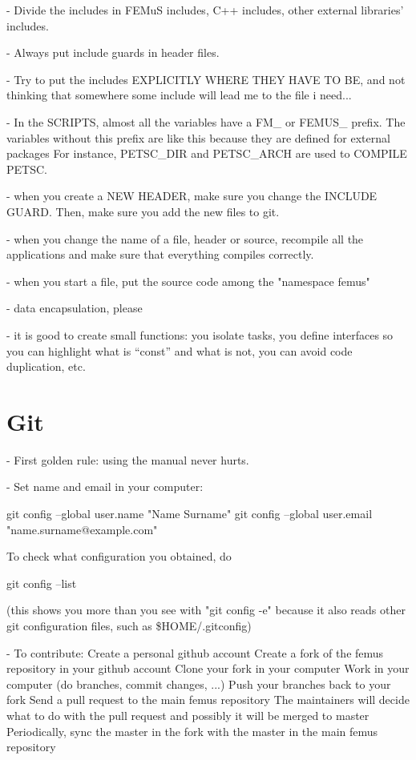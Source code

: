 \documentclass[10pt]{book}
\begin{document}
- Divide the includes in 
FEMuS includes,
 C++ includes,
 other external libraries' includes.

- Always put include guards in header files.

- Try to put the includes EXPLICITLY WHERE THEY HAVE TO BE, 
  and not thinking that somewhere some include will lead me to the file i need...

- In the SCRIPTS, almost all the variables have a FM\_ or FEMUS\_ prefix.
 The variables without this prefix are like this because 
 they are defined for external packages
 For instance, PETSC\_DIR and PETSC\_ARCH are used to COMPILE PETSC.
 
 - when you create a NEW HEADER, make sure you change the INCLUDE GUARD.
 Then, make sure you add the new files to git.
 
 - when you change the name of a file, header or source, recompile all the applications
   and make sure that everything compiles correctly.
   
 - when you start a file, put the source code among the "namespace femus"

 - data encapsulation, please
 
 - it is good to create small functions: you isolate tasks, 
   you define interfaces so you can highlight what is ``const'' and what is not,
   you can avoid code duplication, etc.
   
 
\chapter{Git}


- First golden rule: using the manual never hurts.

- Set name and email in your computer:

  git config --global user.name "Name Surname"
  git config --global user.email "name.surname@example.com"

  To check what configuration you obtained, do 

  git config --list 

  (this shows you more than you see with "git config -e"
  because it also reads other git configuration files,
  such as \$HOME/.gitconfig)

- To contribute:
  Create a personal github account 
  Create a fork of the femus repository in your github account
  Clone your fork in your computer
  Work in your computer (do branches, commit changes, ...)
  Push your branches back to your fork 
  Send a pull request to the main femus repository
  The maintainers will decide what to do with the pull request and possibly it will be merged to master
  Periodically, sync the master in the fork with the master in the main femus repository
\end{document}
